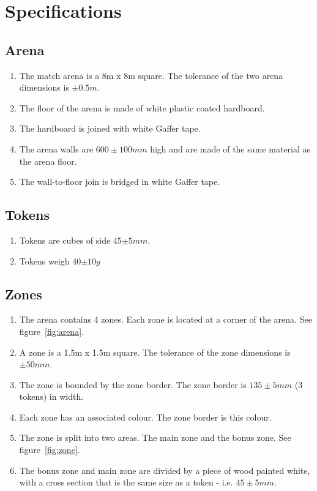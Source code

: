 \section{Specifications}
\newcommand{\rcnii}{\stepcounter{rule}\arabic{subsection}.\arabic{rule}}
\renewcommand{\labelenumi}{\rcn}

\subsection{Arena}
\begin{enumerate}
\item The match arena is a 8m x 8m square.  The tolerance of the two arena dimensions is $\pm0.5m$.
\item The floor of the arena is made of white plastic coated hardboard.
\item The hardboard is joined with white Gaffer tape.
\item The arena walls are $600\pm100mm$ high and are made of the same material as the arena floor.
\item The wall-to-floor join is bridged in white Gaffer tape.
\end{enumerate}

\subsection{Tokens}
\label{tokens}

\begin {enumerate} 
\item Tokens are cubes of side 45$\pm5mm$.
\item Tokens weigh 40$\pm10g$
\end {enumerate}

\subsection{Zones}
\begin {enumerate}
\item The arena contains 4 zones.  Each zone is located at a corner of the arena.  See figure~\ref{fig:arena}.
\item A zone is a 1.5m x 1.5m square.  The tolerance of the zone dimensions is $\pm50mm$.
\item The zone is bounded by the zone border.  The zone border is $135\pm5mm$ (3 tokens) in width.
\item Each zone has an associated colour.  The zone border is this colour.
\item The zone is split into two areas.  The main zone and the bonus zone.  See figure~\ref{fig:zone}.
\item The bonus zone and main zone are divided by a piece of wood painted white, with a cross section that is the same size as a token - i.e. $45\pm5mm$.
\end {enumerate}

